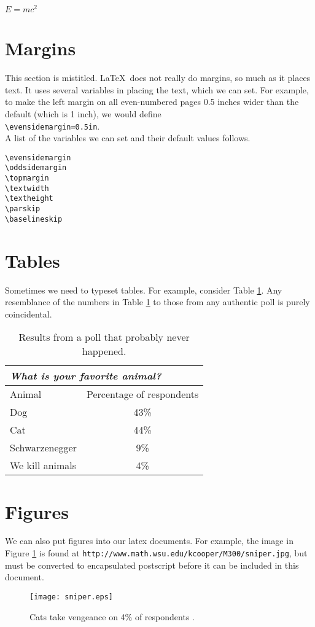 \documentclass[12pt]{article}
\begin{document}
$E=mc^2$

\section{Margins}
This section is mistitled.  \LaTeX\ does not really do margins,
so much as it places text.  It uses several variables in placing the
text, which we can set.  For example, to make the left margin on
all even-numbered pages 0.5 inches wider than the default (which is 
1 inch), we would define\\
\verb(\evensidemargin=0.5in(.\\
A list of the variables we can set and their default values follows.
\begin{verbatim}
\evensidemargin
\oddsidemargin
\topmargin
\textwidth
\textheight
\parskip
\baselineskip
\end{verbatim}

\section{Tables}
Sometimes we need to typeset tables.  For example, 
consider Table \ref{animaltable}.  
Any resemblance of the numbers in 
Table \ref{animaltable} to those from any authentic poll is purely coincidental.
\begin{table}
\begin{center}
\caption{\label{animaltable}
Results from a poll that probably never happened.}
\begin{tabular}{||l|c||}
\hline
\cline{1-2}
\multicolumn{2}{||l||}{{\it What is your favorite animal?}}\\
\hline
Animal & Percentage of respondents\\
\hline
Dog & 43\%\\
Cat & 44\%\\
Schwarzenegger & 9\%\\
We kill animals & 4\%\\
\hline
\hline
\end{tabular}
\end{center}
\end{table}

\section{Figures}
We can also put figures into our latex documents.  For example, the
image in Figure \ref{sniper} is found at 
{\tt http://www.math.wsu.edu/kcooper/M300/sniper.jpg}, but must
be converted to encapsulated postscript before it can be included
in this document.
\begin{figure}[ht]
\begin{center}
\texttt{[image: sniper.eps]}
\caption{\label{sniper}
Cats take vengeance on 4\% of respondents \cite{calvin}.}
\vfill
\end{center}
\end{figure}
\end{document}
